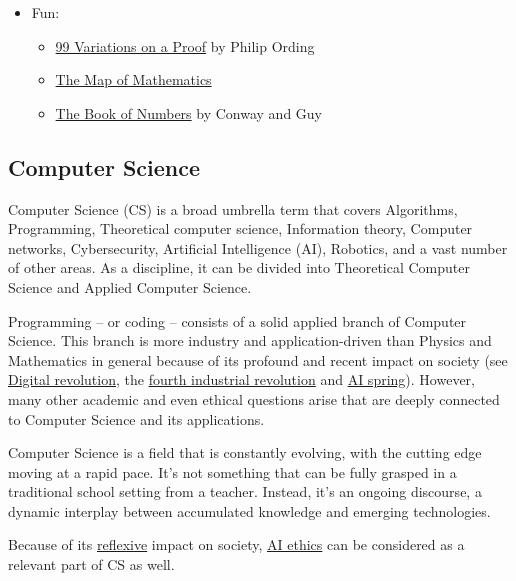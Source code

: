 \documentclass{article}
\begin{document}
\begin{itemize}
    \item Fun:
    \begin{itemize}
        \item \href{https://www.goodreads.com/en/book/show/40000474-99-variations-on-a-proof}{99 Variations on a Proof} by Philip Ording
        \item \href{https://www.youtube.com/watch?v=OmJ-4B-mS-Y}{The Map of Mathematics}
        \item \href{https://www.goodreads.com/book/show/682027.The_Book_of_Numbers}{The Book of Numbers} by Conway and Guy
    \end{itemize}
    
    
\end{itemize}

\subsection{Computer Science}

Computer Science (CS) is a broad umbrella term that covers Algorithms, Programming, Theoretical computer science, Information theory, Computer networks, Cybersecurity, Artificial Intelligence (AI), Robotics, and a vast number of other areas.
As a discipline, it can be divided into Theoretical Computer Science and Applied Computer Science. 

Programming -- or coding -- consists of a solid applied branch of Computer Science.
This branch is more industry and application-driven than Physics and Mathematics in general because of its profound and recent impact on society (see \href{https://en.wikipedia.org/wiki/Digital_Revolution}{Digital revolution}, the  \href{https://www.weforum.org/agenda/2016/01/the-fourth-industrial-revolution-what-it-means-and-how-to-respond/}{fourth industrial revolution} and \href{https://en.wikipedia.org/wiki/AI_boom}{AI spring}).
However, many other academic and even ethical questions arise that are deeply connected to Computer Science and its applications.

Computer Science is a field that is constantly evolving, with the cutting edge moving at a rapid pace. It's not something that can be fully grasped in a traditional school setting from a teacher. Instead, it's an ongoing discourse, a dynamic interplay between accumulated knowledge and emerging technologies.

Because of its \href{https://en.wikipedia.org/wiki/Reflexivity_(social_theory)}{reflexive} impact on society, \href{https://en.wikipedia.org/wiki/Ethics_of_artificial_intelligence}{AI ethics} can be considered as a relevant part of CS as well.
\end{document}
